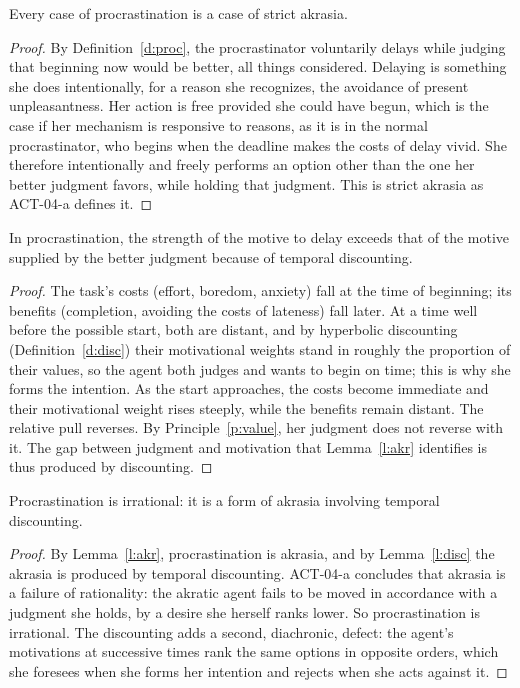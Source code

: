 \documentclass{situationist-preprint}
\begin{document}
\begin{lemma}\label{l:akr}
Every case of procrastination is a case of strict akrasia.
\end{lemma}

\begin{proof}
By Definition~\ref{d:proc}, the procrastinator voluntarily delays while judging that beginning now would be better, all things considered. Delaying is something she does intentionally, for a reason she recognizes, the avoidance of present unpleasantness. Her action is free provided she could have begun, which is the case if her mechanism is responsive to reasons, as it is in the normal procrastinator, who begins when the deadline makes the costs of delay vivid. She therefore intentionally and freely performs an option other than the one her better judgment favors, while holding that judgment. This is strict akrasia as ACT-04-a defines it.
\end{proof}

\begin{lemma}\label{l:disc}
In procrastination, the strength of the motive to delay exceeds that of the motive supplied by the better judgment because of temporal discounting.
\end{lemma}

\begin{proof}
The task's costs (effort, boredom, anxiety) fall at the time of beginning; its benefits (completion, avoiding the costs of lateness) fall later. At a time well before the possible start, both are distant, and by hyperbolic discounting (Definition~\ref{d:disc}) their motivational weights stand in roughly the proportion of their values, so the agent both judges and wants to begin on time; this is why she forms the intention. As the start approaches, the costs become immediate and their motivational weight rises steeply, while the benefits remain distant. The relative pull reverses. By Principle~\ref{p:value}, her judgment does not reverse with it. The gap between judgment and motivation that Lemma~\ref{l:akr} identifies is thus produced by discounting.
\end{proof}

\begin{theorem}\label{t:main}
Procrastination is irrational: it is a form of akrasia involving temporal discounting.
\end{theorem}

\begin{proof}
By Lemma~\ref{l:akr}, procrastination is akrasia, and by Lemma~\ref{l:disc} the akrasia is produced by temporal discounting. ACT-04-a concludes that akrasia is a failure of rationality: the akratic agent fails to be moved in accordance with a judgment she holds, by a desire she herself ranks lower. So procrastination is irrational. The discounting adds a second, diachronic, defect: the agent's motivations at successive times rank the same options in opposite orders, which she foresees when she forms her intention and rejects when she acts against it.
\end{proof}
\end{document}
